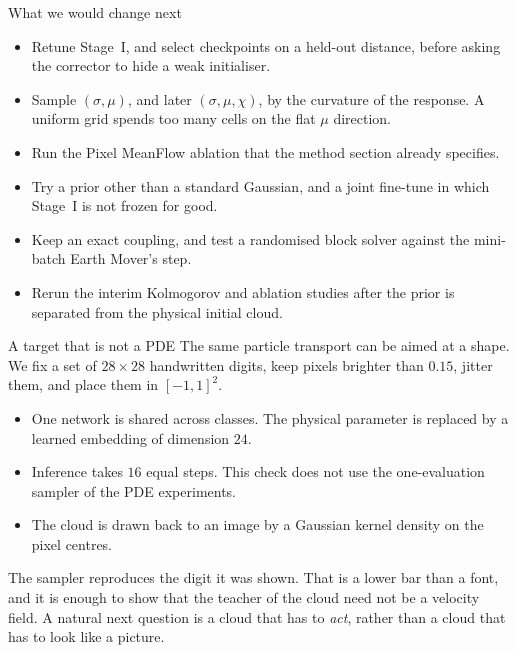 \documentclass[aspectratio=169,11pt,t]{beamer}
\begin{document}
\begin{frame}{What we would change next}
  \begin{itemize}
    \item Retune Stage~I, and select checkpoints on a held-out distance, before asking the corrector to hide a weak initialiser.
    \item Sample $(\sigma,\mu)$, and later $(\sigma,\mu,\chi)$, by the curvature of the response. A uniform grid spends too many cells on the flat $\mu$ direction.
    \item Run the Pixel MeanFlow ablation that the method section already specifies.
    \item Try a prior other than a standard Gaussian, and a joint fine-tune in which Stage~I is not frozen for good.
    \item Keep an exact coupling, and test a randomised block solver against the mini-batch Earth Mover's step.
    \item Rerun the interim Kolmogorov and ablation studies after the prior is separated from the physical initial cloud.
  \end{itemize}
\end{frame}

\begin{frame}{A target that is not a PDE}
  The same particle transport can be aimed at a shape.
  We fix a set of $28\times 28$ handwritten digits, keep pixels brighter than $0.15$, jitter them, and place them in $[-1,1]^2$.
  \vspace{0.4em}
  \begin{itemize}
    \item One network is shared across classes. The physical parameter is replaced by a learned embedding of dimension $24$.
    \item Inference takes $16$ equal steps. This check does not use the one-evaluation sampler of the PDE experiments.
    \item The cloud is drawn back to an image by a Gaussian kernel density on the pixel centres.
  \end{itemize}
  \vspace{0.4em}
  The sampler reproduces the digit it was shown.
  That is a lower bar than a font, and it is enough to show that the teacher of the cloud need not be a velocity field.
  A natural next question is a cloud that has to \emph{act}, rather than a cloud that has to look like a picture.
\end{frame}
\end{document}
